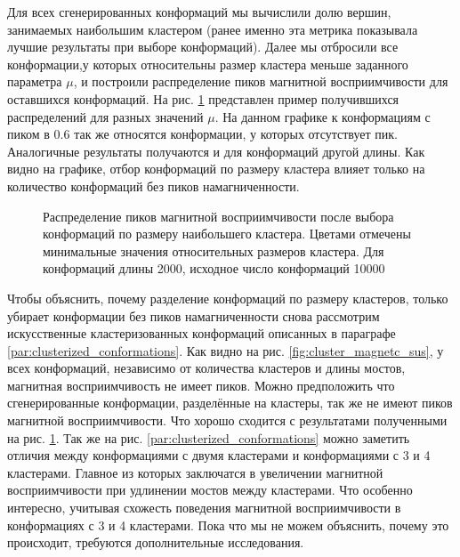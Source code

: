 Для всех сгенерированных конформаций мы вычислили долю вершин, занимаемых наибольшим кластером (ранее именно эта метрика показывала лучшие результаты при выборе конформаций). Далее мы отбросили все конформации,у которых относительны размер кластера меньше заданного параметра $\mu$, и построили распределение пиков магнитной восприимчивости для оставшихся конформаций. На рис. \ref{fig:peaks_chosen_by_cluster} представлен пример получившихся распределений для разных значений $\mu$. На данном графике к конформациям с пиком в 0.6 так же относятся конформации, у которых отсутствует пик. Аналогичные результаты получаются и для конформаций другой длины. Как видно на графике, отбор конформаций по размеру кластера влияет только на количество конформаций без пиков намагниченности.

\begin{figure}[ht]
	\centering
	
	\caption{Распределение пиков магнитной восприимчивости после выбора конформаций по размеру наибольшего кластера. Цветами отмечены минимальные значения относительных размеров кластера. Для конформаций длины 2000, исходное число конформаций 10000}
	\label{fig:peaks_chosen_by_cluster}

\end{figure}

Чтобы объяснить, почему разделение конформаций по размеру кластеров, только убирает конформации без пиков намагниченности снова рассмотрим искусственные кластеризованных конформаций описанных в параграфе \ref{par:clusterized_conformations}. Как видно на рис. \ref{fig:cluster_magnetc_sus}, у всех конформаций, независимо от количества кластеров и длины мостов, магнитная восприимчивость не имеет пиков. Можно предположить что сгенерированные конформации, разделённые на кластеры, так же не имеют пиков магнитной восприимчивости. Что хорошо сходится с результатами полученными на рис. \ref{fig:peaks_chosen_by_cluster}. Так же на рис. \ref{par:clusterized_conformations} можно заметить отличия между конформациями с двумя кластерами и конформациями с 3 и 4 кластерами. Главное из которых заключатся в увеличении магнитной восприимчивости при удлинении мостов между кластерами. Что особенно интересно, учитывая схожесть поведения магнитной восприимчивости в конформациях с 3 и 4 кластерами. Пока что мы не можем объяснить, почему это происходит, требуются дополнительные исследования.

